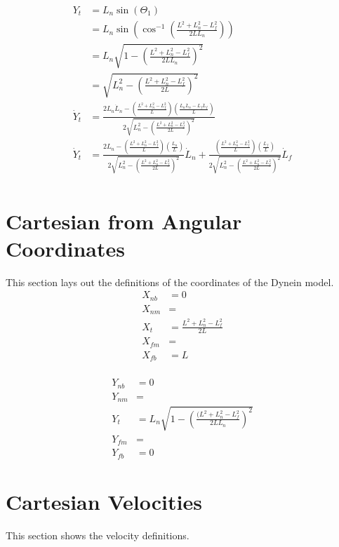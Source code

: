 \documentclass[11pt, landscape]{article}
\begin{document}
\begin{align}
  Y_{t} &= L_n\sin(\Theta_{1}) \\
  &= L_n\sin\left(\cos^{-1}\left(\frac{L^2+L_n^2-L_f^2}{2LL_n}\right)\right) \\
  &= L_n\sqrt{1 - \left(\frac{L^2+L_n^2-L_f^2}{2LL_n}\right)^2} \\
  &= \sqrt{L_n^2 - \left(\frac{L^2+L_n^2-L_f^2}{2L}\right)^2} \\
  \dot{Y}_t &= \frac{2L_n\dot{L}_n - \left(\frac{L^2+L_n^2-L_f^2}{L}\right)\left(\frac{L_n\dot{L}_n - L_f\dot{L}_f}{L}\right)}{2\sqrt{L_n^2 - \left(\frac{L^2+L_n^2-L_f^2}{2L}\right)^2}}\\
  \dot{Y}_t &= \frac{2L_n - \left(\frac{L^2+L_n^2-L_f^2}{L}\right)\left(\frac{L_n}{L}\right)}{2\sqrt{L_n^2 - \left(\frac{L^2+L_n^2-L_f^2}{2L}\right)^2}}\dot{L}_n +
  \frac{\left(\frac{L^2+L_n^2-L_f^2}{L}\right)\left(\frac{L_f}{L}\right)}{2\sqrt{L_n^2 - \left(\frac{L^2+L_n^2-L_f^2}{2L}\right)^2}}\dot{L}_f\\
\end{align}

\section{Cartesian from Angular Coordinates}
This section lays out the definitions of the coordinates of the Dynein model. \\
\begin{align}
  X_{nb} &= 0 \\
  X_{nm} &=  \\
  X_{t}  &= \frac{L^2+L_n^2-L_f^2}{2L} \\
  X_{fm} &=  \\
  X_{fb} &= L \\
\end{align}

\begin{align}
  Y_{nb} &= 0 \\
  Y_{nm} &=  \\
  Y_{t}  &= L_n\sqrt{1 - \left(\frac{(L^2+L_n^2-L_f^2}{2LL_n}\right)^2} \\
  Y_{fm} &=  \\
  Y_{fb} &= 0
\end{align}

\section{Cartesian Velocities}
This section shows the velocity definitions. \\
\end{document}
